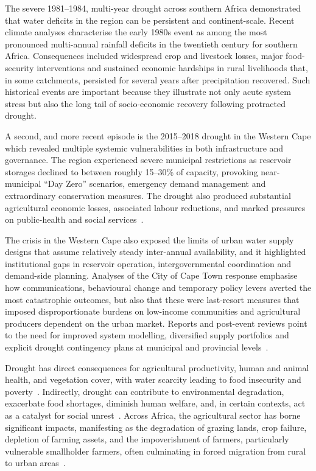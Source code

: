 The severe 1981–1984, multi-year drought across southern Africa demonstrated that water deficits in the region can be persistent and continent-scale. Recent climate analyses characterise the early 1980s event as among the most pronounced multi-annual rainfall deficits in the twentieth century for southern Africa. Consequences included widespread crop and livestock losses, major food-security interventions and sustained economic hardships in rural livelihoods that, in some catchments, persisted for several years after precipitation recovered. Such historical events are important because they illustrate not only acute system stress but also the long tail of socio-economic recovery following protracted drought.

A second, and more recent episode is the 2015–2018 drought in the Western Cape which revealed multiple systemic vulnerabilities in both infrastructure and governance. The region experienced severe municipal restrictions as reservoir storages declined to between roughly 15–30\% of capacity, provoking near-municipal “Day Zero” scenarios, emergency demand management and extraordinary conservation measures. The drought also produced substantial agricultural economic losses, associated labour reductions, and marked pressures on public-health and social services~\cite{su14137582, https://doi.org/10.1002/joc.6785, Sousa_2018}. 

The crisis in the Western Cape also exposed the limits of urban water supply designs that assume relatively steady inter-annual availability, and it highlighted institutional gaps in reservoir operation, intergovernmental coordination and demand-side planning. Analyses of the City of Cape Town response emphasise how communications, behavioural change and temporary policy levers averted the most catastrophic outcomes, but also that these were last-resort measures that imposed disproportionate burdens on low-income communities and agricultural producers dependent on the urban market. Reports and post-event reviews point to the need for improved system modelling, diversified supply portfolios and explicit drought contingency plans at municipal and provincial levels~\cite{Joubert_Ziervogel_2019,Babajide}.

Drought has direct consequences for agricultural productivity, human and animal health, and vegetation cover, with water scarcity leading to food insecurity and poverty~\cite{SHIFERAW201467}. Indirectly, drought can contribute to environmental degradation, exacerbate food shortages, diminish human welfare, and, in certain contexts, act as a catalyst for social unrest~\cite{https://doi.org/10.1155/2014/508953}. Across Africa, the agricultural sector has borne significant impacts, manifesting as the degradation of grazing lands, crop failure, depletion of farming assets, and the impoverishment of farmers, particularly vulnerable smallholder farmers, often culminating in forced migration from rural to urban areas~\cite{SHIFERAW201467}. 

